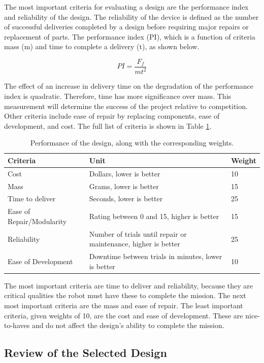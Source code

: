 \documentclass[ece]{uw-wkrpt}
\begin{document}
The most important criteria for evaluating a design are the performance index and reliability of the design. The reliability of the device is defined as the number of successful deliveries completed by a design before requiring major repairs or replacement of parts. The performance index (PI), which is a function of criteria mass (m) and time to complete a delivery (t), as shown below.

\[PI = \frac{F_f}{mt^2}\]

The effect of an increase in delivery time on the degradation of the performance index is quadratic. Therefore, time has more significance over mass. This measurement will determine the success of the project relative to competition. Other criteria include ease of repair by replacing components, ease of development, and cost. The full list of criteria is shown in Table \ref{tab:designSelection}. 


\begin{table}[]
\centering
\caption[Performance of the design, along with the corresponding weights]
{Performance of the design, along with the corresponding weights.}
\begin{tabular}{ | l | p{4in} | l |}
\hline
Criteria & Unit & Weight \\ \hline
Cost & Dollars, lower is better & 10 \\ \hline
Mass & Grams, lower is better & 15 \\ \hline
Time to deliver & Seconds, lower is better & 25 \\ \hline
Ease of Repair/Modularity & Rating between 0 and 15, higher is better & 15 \\ \hline
Reliability & Number of trials until repair or maintenance, higher is better & 25 \\ \hline
Ease of Development & Downtime between trials in minutes, lower is better & 10 \\ \hline
\end{tabular}
\label{tab:designSelection}
\end{table}

The most important criteria are time to deliver and reliability, because they are critical qualities the robot must have these to complete the mission. The next most important criteria are the mass and ease of repair. The least important criteria, given weights of 10, are the cost and ease of development. These are nice-to-haves and do not affect the design’s ability to complete the mission.

\subsection{Review of the Selected Design}
\end{document}
